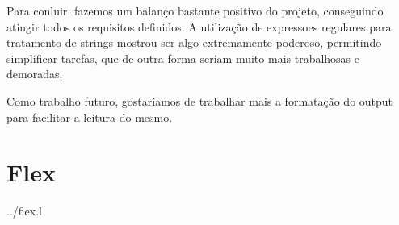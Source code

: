 \documentclass[a4paper]{report}
\begin{document}
Para conluir, fazemos um balanço bastante positivo do projeto, conseguindo
atingir todos os requisitos definidos. A utilização de expressoes regulares
para tratamento de strings mostrou ser algo extremamente poderoso, permitindo
simplificar tarefas, que de outra forma seriam muito mais trabalhosas e demoradas.

Como trabalho futuro, gostaríamos de trabalhar mais a formatação do output
para facilitar a leitura do mesmo.

\appendix

\chapter{Flex}


{../flex.l}
\end{document}
